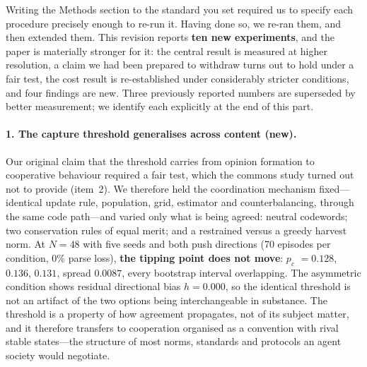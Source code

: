 \documentclass[11pt,a4paper]{article}
\newcommand{\pc}{$p_c$}
\begin{document}
Writing the Methods section to the standard you set required us to specify each
procedure precisely enough to re-run it. Having done so, we re-ran them, and then
extended them. This revision reports \textbf{ten new experiments}, and the paper is
materially stronger for it: the central result is measured at higher resolution, a
claim we had been prepared to withdraw turns out to hold under a fair test, the
cost result is re-established under considerably stricter conditions, and four
findings are new. Three previously reported numbers are superseded by better
measurement; we identify each explicitly at the end of this part.

\paragraph{1. The capture threshold generalises across content (new).}
Our original claim that the threshold carries from opinion formation to cooperative
behaviour required a fair test, which the commons study turned out not to provide
(item~2). We therefore held the coordination mechanism fixed---identical update
rule, population, grid, estimator and counterbalancing, through the same code
path---and varied only what is being agreed: neutral codewords; two conservation
rules of equal merit; and a restrained versus a greedy harvest norm. At $N=48$ with
five seeds and both push directions (70 episodes per condition, 0\% parse loss),
\textbf{the tipping point does not move}: \pc{} $=0.128$, $0.136$, $0.131$, spread
$0.0087$, every bootstrap interval overlapping. The asymmetric condition shows
residual directional bias $h=0.000$, so the identical threshold is not an artifact
of the two options being interchangeable in substance. The threshold is a property
of how agreement propagates, not of its subject matter, and it therefore transfers
to cooperation organised as a convention with rival stable states---the structure of
most norms, standards and protocols an agent society would negotiate.
\end{document}
